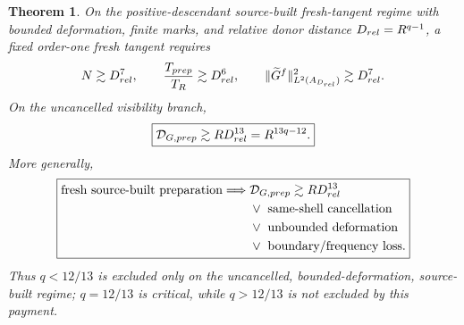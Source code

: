 \documentclass[10pt,a4paper]{amsart}
\newtheorem{theorem}{Theorem}
\begin{document}
\begin{theorem}\label{thm:q1213}
On the positive-descendant source-built fresh-tangent regime with bounded
deformation, finite marks, and relative donor distance
$D_{\rm rel}=R^{q-1}$, a fixed order-one fresh tangent requires
\[
N\gtrsim D_{\rm rel}^7,
\qquad
\frac{T_{\rm prep}}{T_R}\gtrsim D_{\rm rel}^6,
\qquad
\|\widetilde G^f\|_{L^2(A_{D_{\rm rel}})}^2\gtrsim D_{\rm rel}^7.
\]
On the uncancelled visibility branch,
\[
\boxed{
\mathcal D_{G,\rm prep}
\gtrsim R D_{\rm rel}^{13}
=R^{13q-12}.}
\]
More generally,
\[
\boxed{\begin{aligned}
\text{fresh source-built preparation}\Longrightarrow{}&
\mathcal D_{G,\rm prep}\gtrsim R D_{\rm rel}^{13}\\
&\vee\ \text{same-shell cancellation}\\
&\vee\ \text{unbounded deformation}\\
&\vee\ \text{boundary/frequency loss}.
\end{aligned}}
\]
Thus $q<12/13$ is excluded only on the uncancelled, bounded-deformation,
source-built regime; $q=12/13$ is critical, while $q>12/13$ is not excluded by
this payment.
\end{theorem}
\end{document}
